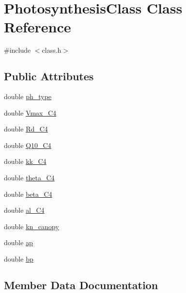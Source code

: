 \hypertarget{class_photosynthesis_class}{}\section{Photosynthesis\+Class Class Reference}
\label{class_photosynthesis_class}


{\ttfamily \#include $<$class.\+h$>$}

\subsection*{Public Attributes}
\begin{DoxyCompactItemize}
\item 
double \hyperlink{class_photosynthesis_class_afa5840801d1bc080972f1c5134e243fa}{ph\+\_\+type}
\item 
double \hyperlink{class_photosynthesis_class_a2bbe02243ae126dc85e70263847a51e8}{Vmax\+\_\+\+C4}
\item 
double \hyperlink{class_photosynthesis_class_af7f940a708e4c996e72e4e7871beffe6}{Rd\+\_\+\+C4}
\item 
double \hyperlink{class_photosynthesis_class_a649cfcb3edd4091c74199bf84cde0c13}{Q10\+\_\+\+C4}
\item 
double \hyperlink{class_photosynthesis_class_a762b687e104cd5b9f902ac1c6d00ee91}{kk\+\_\+\+C4}
\item 
double \hyperlink{class_photosynthesis_class_aa5dc025d0bfa1248fff58990bfa1cd73}{theta\+\_\+\+C4}
\item 
double \hyperlink{class_photosynthesis_class_acba6f7b340e86b6b27e6c07be37ded04}{beta\+\_\+\+C4}
\item 
double \hyperlink{class_photosynthesis_class_aeb04781ea60cd4f01fdab4b4e76be0d1}{al\+\_\+\+C4}
\item 
double \hyperlink{class_photosynthesis_class_af7da463344896a47e92fdca0363ada09}{kn\+\_\+canopy}
\item 
double \hyperlink{class_photosynthesis_class_a27b3ad82b1ece6975ca07d0a1aebd20e}{ap}
\item 
double \hyperlink{class_photosynthesis_class_aa848fd9f51c0acbd01a2aad0fdef30b6}{bp}
\end{DoxyCompactItemize}


\subsection{Member Data Documentation}
